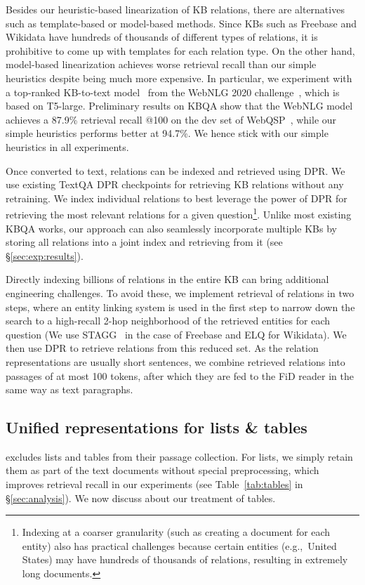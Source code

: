 \documentclass[11pt]{article}
\newcommand{\secref}[1]{\S\ref{#1}}
\begin{document}
Besides our heuristic-based linearization of KB relations, there are alternatives such as template-based or model-based methods.
Since KBs such as Freebase and Wikidata have hundreds of thousands of different types of relations, it is prohibitive to come up with templates for each relation type.
On the other hand, model-based linearization achieves worse retrieval recall than our simple heuristics despite being much more expensive.
In particular, we experiment with a top-ranked KB-to-text model~\cite{li-etal-2020-leveraging-large} from the WebNLG 2020 challenge~\cite{castro-ferreira-etal-2020-2020}, which is based on T5-large.
Preliminary results on KBQA show that the WebNLG model achieves a 87.9\% retrieval recall @100 on the dev set of WebQSP~\cite{yih2016the}, while our simple heuristics performs better at 94.7\%.
We hence stick with our simple heuristics in all experiments.

Once converted to text, relations can be indexed and retrieved using DPR.
We use existing TextQA DPR checkpoints for retrieving KB relations without any retraining.
We index individual relations to best leverage the power of DPR for retrieving the most relevant relations for a given question\footnote{Indexing at a coarser granularity (such as creating a document for each entity) also has practical challenges because certain entities (e.g.,~United States) may have hundreds of thousands of relations, resulting in extremely long documents.}.
Unlike most existing KBQA works, our approach can also seamlessly incorporate multiple KBs by storing all relations into a joint index and retrieving from it (see \secref{sec:exp:results}).

Directly indexing billions of relations in the entire KB can bring additional engineering challenges.  To avoid these, we implement retrieval of relations in two steps, where an entity linking system is used in the first step to narrow down the search to a high-recall 2-hop neighborhood of the retrieved entities for each question (We use STAGG~\citep{yih2015semantic} in the case of Freebase and ELQ \citep{li2020efficient} for Wikidata). 
We then use DPR to retrieve relations from this reduced set. 
As the relation representations are usually short sentences, we combine retrieved relations into passages of at most 100 tokens, after which they are fed to the FiD reader in the same way as text paragraphs.


\subsection{Unified representations for lists \& tables}\label{sec:model:tables}
\citet{DPR} excludes lists and tables from their passage collection.
For lists, we simply retain them as part of the text documents without special preprocessing, which improves retrieval recall in our experiments (see Table~\ref{tab:tables} in \secref{sec:analysis}).
We now discuss about our treatment of tables.
\end{document}
